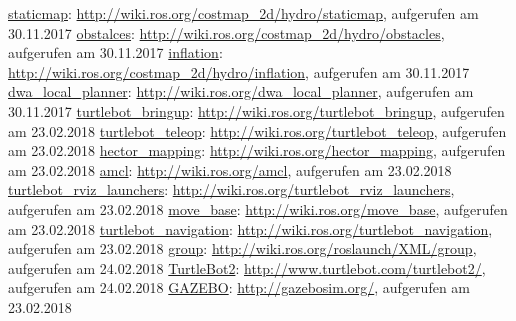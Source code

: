 \begin{thebibliography}{999}
 \href{http://wiki.ros.org/costmap_2d/hydro/staticmap}{staticmap}: \url{http://wiki.ros.org/costmap_2d/hydro/staticmap}, aufgerufen am 30.11.2017
 \href{http://wiki.ros.org/costmap_2d/hydro/obstacles}{obstalces}: \url{http://wiki.ros.org/costmap_2d/hydro/obstacles}, aufgerufen am 30.11.2017
 \href{http://wiki.ros.org/costmap_2d/hydro/inflation}{inflation}: \url{http://wiki.ros.org/costmap_2d/hydro/inflation}, aufgerufen am 30.11.2017
 \href{http://wiki.ros.org/dwa_local_planner}{dwa\_local\_planner}: \url{http://wiki.ros.org/dwa_local_planner}, aufgerufen am 30.11.2017
 \href{http://wiki.ros.org/turtlebot_bringup}{turtlebot\_bringup}: \url{http://wiki.ros.org/turtlebot_bringup}, aufgerufen am 23.02.2018
 \href{http://wiki.ros.org/turtlebot_teleop}{turtlebot\_teleop}: \url{http://wiki.ros.org/turtlebot_teleop}, aufgerufen am 23.02.2018
 \href{http://wiki.ros.org/hector_mapping}{hector\_mapping}: \url{http://wiki.ros.org/hector_mapping}, aufgerufen am 23.02.2018
 \href{http://wiki.ros.org/amcl}{amcl}: \url{http://wiki.ros.org/amcl}, aufgerufen am 23.02.2018
 \href{http://wiki.ros.org/turtlebot_rviz_launchers}{turtlebot\_rviz\_launchers}: \url{http://wiki.ros.org/turtlebot_rviz_launchers}, aufgerufen am 23.02.2018
 \href{http://wiki.ros.org/move_base}{move\_base}: \url{http://wiki.ros.org/move_base}, aufgerufen am 23.02.2018
 \href{http://wiki.ros.org/turtlebot_navigation}{turtlebot\_navigation}: \url{http://wiki.ros.org/turtlebot_navigation}, aufgerufen am 23.02.2018
 \href{http://wiki.ros.org/roslaunch/XML/group}{group}: \url{http://wiki.ros.org/roslaunch/XML/group}, aufgerufen am 24.02.2018
 \href{http://www.turtlebot.com/turtlebot2/}{TurtleBot2}: \url{http://www.turtlebot.com/turtlebot2/}, aufgerufen am 24.02.2018
 \href{http://gazebosim.org/}{GAZEBO}: \url{http://gazebosim.org/}, aufgerufen am 23.02.2018





\end{thebibliography}